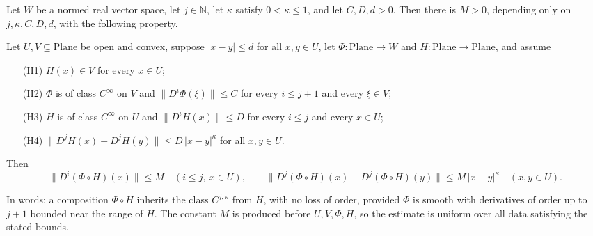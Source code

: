 \begin{lemma}
Let $W$ be a normed real vector space, let $j\in\mathbb{N}$, let $\kappa$ satisfy
$0<\kappa\le1$, and let $C,D,d>0$.  Then there is $M>0$, depending only on
$j,\kappa,C,D,d$, with the following property.

Let $U,V\subseteq\mathrm{Plane}$ be open and convex, suppose
$\lvert x-y\rvert\le d$ for all $x,y\in U$, let $\Phi\colon\mathrm{Plane}\to W$ and
$H\colon\mathrm{Plane}\to\mathrm{Plane}$, and assume
\begin{enumerate}
\item[(H1)] $H(x)\in V$ for every $x\in U$;
\item[(H2)] $\Phi$ is of class $C^{\infty}$ on $V$ and
  $\bigl\lVert D^{i}\Phi(\xi)\bigr\rVert\le C$ for every $i\le j+1$ and every $\xi\in V$;
\item[(H3)] $H$ is of class $C^{\infty}$ on $U$ and
  $\bigl\lVert D^{i}H(x)\bigr\rVert\le D$ for every $i\le j$ and every $x\in U$;
\item[(H4)] $\bigl\lVert D^{j}H(x)-D^{j}H(y)\bigr\rVert\le D\,\lvert x-y\rvert^{\kappa}$ for all
  $x,y\in U$.
\end{enumerate}
Then
\[
  \bigl\lVert D^{i}(\Phi\circ H)(x)\bigr\rVert\le M
  \quad(i\le j,\ x\in U),
  \qquad
  \bigl\lVert D^{j}(\Phi\circ H)(x)-D^{j}(\Phi\circ H)(y)\bigr\rVert
    \le M\,\lvert x-y\rvert^{\kappa}
  \quad(x,y\in U).
\]

In words: a composition $\Phi\circ H$ inherits the class $C^{j,\kappa}$ from $H$, with no loss
of order, provided $\Phi$ is smooth with derivatives of order up to $j+1$ bounded near the range
of $H$.  The constant $M$ is produced before $U,V,\Phi,H$, so the estimate is uniform over all
data satisfying the stated bounds.
\end{lemma}
